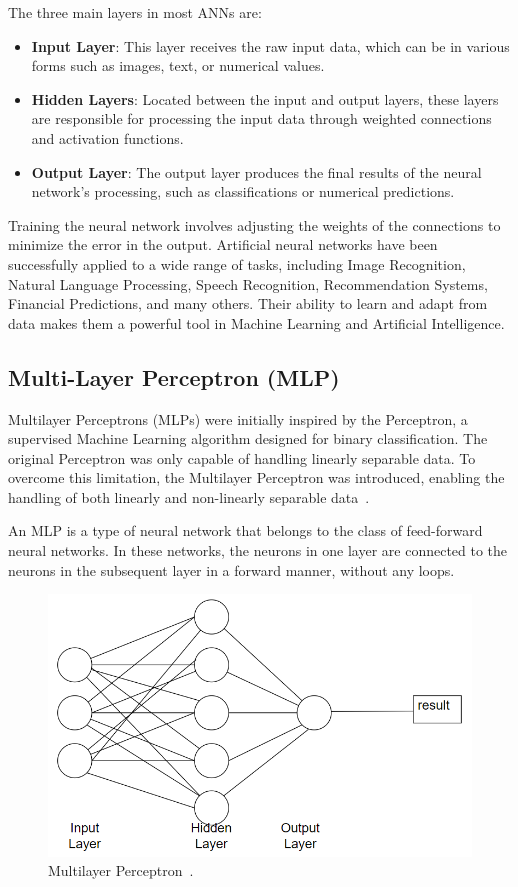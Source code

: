 \documentclass[12pt,a4paper]{report}
\begin{document}
The three main layers in most ANNs are:

\begin{itemize}
  \item \textbf{Input Layer}: This layer receives the raw input data, which can be in various forms such as images, text, or numerical values.
  \item \textbf{Hidden Layers}: Located between the input and output layers, these layers are responsible for processing the input data through weighted connections and activation functions.
  \item \textbf{Output Layer}: The output layer produces the final results of the neural network’s processing, such as classifications or numerical predictions.
\end{itemize}

Training the neural network involves adjusting the weights of the connections to minimize the error in the output. Artificial neural networks have been successfully applied to a wide range of tasks, including Image Recognition, Natural Language Processing, Speech Recognition, Recommendation Systems, Financial Predictions, and many others. Their ability to learn and adapt from data makes them a powerful tool in Machine Learning and Artificial Intelligence.

\subsection{Multi-Layer Perceptron (MLP)}
Multilayer Perceptrons (MLPs) were initially inspired by the Perceptron, a supervised Machine Learning algorithm designed for binary classification. The original Perceptron was only capable of handling linearly separable data. To overcome this limitation, the Multilayer Perceptron was introduced, enabling the handling of both linearly and non-linearly separable data~\cite{mlp}.

An MLP is a type of neural network that belongs to the class of feed-forward neural networks. In these networks, the neurons in one layer are connected to the neurons in the subsequent layer in a forward manner, without any loops.

\begin{figure}[th]
  \centering
  \includegraphics[scale=0.65]{./pics/mlp.png}
  \caption[Multilayer Perceptron]{Multilayer Perceptron~\cite{mlp}.}
  \label{fig:pi5}
\end{figure}
\end{document}
